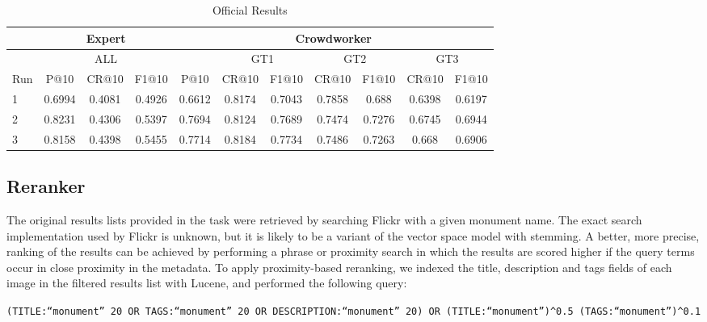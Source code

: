 \documentclass{../acm_proc_article-me11_tweaked}
\begin{document}
\begin{table}[ht]
	\centering
	\caption{\label{tab:results}Official Results}
	\begin{tabular}{|l|||c|c|c|||c||c|c||c|c||c|c|}
		\hline
		 & \multicolumn{3}{c|||}{Expert} &  \multicolumn{7}{c|}{Crowdworker}\\
		\hline
		 & \multicolumn{3}{c|||}{ALL} &  & \multicolumn{2}{c||}{GT1} & \multicolumn{2}{c||}{GT2} & \multicolumn{2}{c|}{GT3}\\
		Run & P@10 & CR@10 & F1@10 & P@10 & CR@10 & F1@10 & CR@10 & F1@10 & CR@10 & F1@10 \\
		\hline\hline
		1 & 0.6994 & 0.4081 & 0.4926 & 0.6612 & 0.8174 & 0.7043 & 0.7858 & 0.688 & 0.6398 & 0.6197 \\
		\hline
		2 & 0.8231 & 0.4306 & 0.5397 & 0.7694 & 0.8124 & 0.7689 & 0.7474 & 0.7276 & 0.6745 & 0.6944 \\
		\hline
		3 & 0.8158 & 0.4398 & 0.5455 & 0.7714 & 0.8184 & 0.7734 & 0.7486 & 0.7263 & 0.668 & 0.6906 \\
		\hline
	\end{tabular}
\end{table}



\subsection{Reranker}
The original results lists provided in the task were retrieved by searching Flickr with a given monument name. The exact search implementation used by Flickr is unknown, but it is likely to be a variant of the vector space model with stemming. A better, more precise, ranking of the results can be achieved by performing a phrase or proximity search in which the results are scored higher if the query terms occur in close proximity in the metadata. To apply proximity-based reranking, we indexed the title, description and tags fields of each image in the filtered results list with Lucene, and performed the following query:
\begin{alltt}
\texttt{(TITLE:``\emph{monument}''~20 OR TAGS:``\emph{monument}''~20 OR 
  DESCRIPTION:``\emph{monument}''~20) OR
  (TITLE:``\emph{monument}'')^0.5 (TAGS:``\emph{monument}'')^0.1}
\end{alltt}
\end{document}
